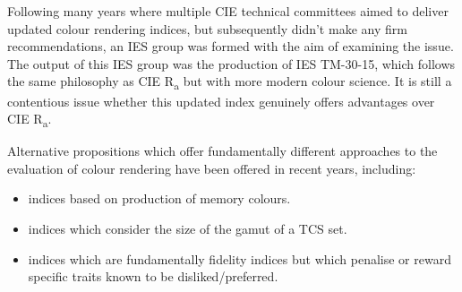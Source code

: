 Following many years where multiple \gls{CIE} technical committees aimed to deliver updated colour rendering indices, but subsequently didn't make any firm recommendations, an IES group was formed with the aim of examining the issue. The output of this IES group was the production of IES TM-30-15\cite{color_metric_task_group_of_the_ies_ies_2015}, which follows the same philosophy as \gls{CIE} R\textsubscript{a} but with more modern colour science. It is still a contentious issue whether this updated index genuinely offers advantages over \gls{CIE} R\textsubscript{a}. 

Alternative propositions which offer fundamentally different approaches to the evaluation of colour rendering have been offered in recent years, including: 
\begin{itemize}
\item indices based on production of memory colours\citep{smet_memory_2012}.
\item indices which consider the size of the gamut of a TCS set\citep{rea_color_2008,teunissen_characterising_2016}.
\item indices which are fundamentally fidelity indices but which penalise or reward specific traits known to be disliked/preferred\citep{ohno_rationale_2010}.
\end{itemize}


